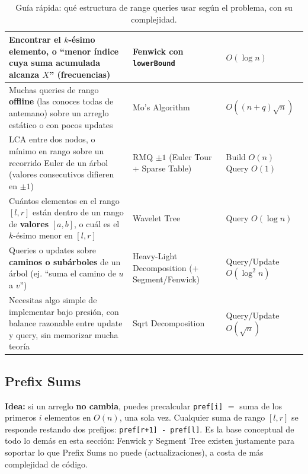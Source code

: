 \documentclass[10pt,a4paper,twocolumn]{article}
\begin{document}
\begin{table}[H]
\begin{tabular}{|p{}|p{}|p{}|}
Encontrar el $k$-ésimo elemento, o ``menor índice cuya suma acumulada
alcanza $X$'' (frecuencias) &
Fenwick con \texttt{lowerBound} &
$O(\log n)$ \\
\hline

Muchas queries de rango \textbf{offline} (las conoces todas de antemano)
sobre un arreglo estático o con pocos updates &
Mo's Algorithm &
$O((n+q)\sqrt{n})$ \\
\hline

LCA entre dos nodos, o mínimo en rango sobre un recorrido Euler de un
árbol (valores consecutivos difieren en $\pm1$) &
RMQ $\pm1$ \newline (Euler Tour + Sparse Table) &
Build $O(n)$ \newline Query $O(1)$ \\
\hline

Cuántos elementos en el rango $[l,r]$ están dentro de un rango de
\textbf{valores} $[a,b]$, o cuál es el $k$-ésimo menor en $[l,r]$ &
Wavelet Tree &
Query $O(\log n)$ \\
\hline

Queries o updates sobre \textbf{caminos o subárboles} de un árbol
(ej. ``suma el camino de $u$ a $v$'') &
Heavy-Light Decomposition \newline (+ Segment/Fenwick) &
Query/Update \newline $O(\log^2 n)$ \\
\hline

Necesitas algo simple de implementar bajo presión, con balance
razonable entre update y query, sin memorizar mucha teoría &
Sqrt Decomposition &
Query/Update $O(\sqrt{n})$ \\
\hline

\end{tabular}
\caption{Guía rápida: qué estructura de range queries usar según el problema, con su complejidad.}
\end{table}

\subsection{Prefix Sums}

\textbf{Idea:} si un arreglo \textbf{no cambia}, puedes precalcular
\texttt{pref[i]} $=$ suma de los primeros $i$ elementos en $O(n)$, una
sola vez. Cualquier suma de rango $[l,r]$ se responde restando dos
prefijos: \texttt{pref[r+1] - pref[l]}. Es la base conceptual de todo
lo demás en esta sección: Fenwick y Segment Tree existen justamente
para soportar lo que Prefix Sums no puede (actualizaciones), a costa
de más complejidad de código.
\end{document}
